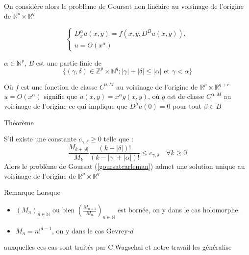 \documentclass{beamer}
\newcommand{\N}{\ensuremath{\mathbb{N}}}
\newcommand{\Np}{\ensuremath{\mathbb{N}^p}}
\newcommand{\Mpq}{\ensuremath{\mathbb{R}^p\times \mathbb{R}^q}}
\newcommand{\ZpNq}{\ensuremath{\mathbb{Z}^p\times \mathbb{N}^q}}
\begin{document}
\begin{frame}
On considère  alors le problème de Goursat non linéaire au voisinage  de l'origine de $\Mpq$

\begin{equation}\label{goursatcarleman}
 \left\{
 \begin{array}{c}
 D^\alpha_x u(x,y)= f(x,y,D^Bu(x,y)),\\
 u=O(x^\alpha)
 \end{array}
 \right.
\end{equation}

$ \alpha \in  \Np$, $ B $  est une partie finie de $$ \{ ( \gamma , \delta) \in \ZpNq ; |\gamma| +|\delta|\leq | \alpha| \text{ et } \gamma < \alpha\}$$

Où $f$ est une fonction de  classe $C^{0,M }$ au voisinage de l'origine de $ \mathbb{R}^p \times \mathbb{R}^{q+r}$ \\
$u=O(x^\alpha) $ signifie que $  u(x,y)=x^\alpha g(x,y)$, où $g$ est de  classe $C^{\alpha,M }$ au voisinage de l'origine ce qui implique que $ D^\beta u(0)=0$  pour tout $ \beta \in B$
\end{frame}


\begin{frame}
\begin{block}{Théorème}

S'il existe une constante $ c_{\gamma, \delta} \geq 0$ telle que :
\begin{equation*}
\frac{M_{k+|\delta|}}{M_k}  \frac{(k+|\delta|)!}{ (k-|\gamma|+|\alpha|)!}  \leq c_{\gamma, \delta}    \quad \forall k \geq 0 
\end{equation*} 
 Alors le problème de Goursat (\ref{goursatcarleman}) admet une solution unique au voisinage de l'origine de $\Mpq$
\end{block}

\begin{block}{Remarque}
Lorsque
\begin{itemize}
\item $(M_n)_{n \in \N}$ ou bien $ (\frac{M_{n+1}}{M_n})_{n \in \N}$ est bornée, on y dans le cas holomorphe.
\item $M_n=n!^{d-1}$, on y dans le cas Gevrey-$d$
\end{itemize} auxquelles ces cas sont traités par C.Wagschal et notre travail les généralise
\end{block}

\end{frame}
\end{document}
